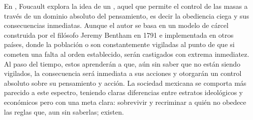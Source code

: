 En \cite{foucault2002vigilar}, Foucault explora la idea de un , aquel que permite el control de las masas
a través de un dominio absoluto del pensamiento, es decir la obediencia ciega y sus consecuencias inmediatas. Aunque el autor se
basa en un modelo de cárcel construida por el filósofo Jeremy Bentham en 1791 e implementada en otros países, donde la población o
 son constantemente vigiladas al punto de que si cometen una falta al orden establecido, serán castigados
con extrema inmediatez. Al paso del tiempo, estos aprenderán a que, aún sin saber que no están siendo vigilados, la consecuencia será
inmediata a sus acciones y otorgarán un control absoluto sobre su pensamiento y acción. La sociedad mexicana se comporta más parecido
a este espectro, teniendo claras diferencias entre estratos ideológicos y económicos pero con una meta clara: sobrevivir y recriminar
a quién no obedece las reglas que, aun sin saberlas; existen.
